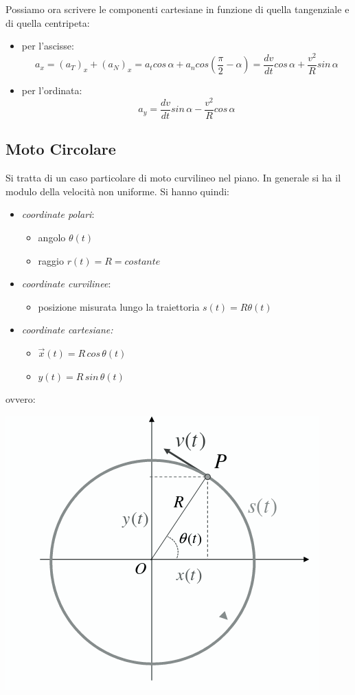 \documentclass[a4paper,12pt, oneside]{book}
\begin{document}
Possiamo ora scrivere le componenti cartesiane in funzione di quella tangenziale e di quella centripeta:
\begin{itemize}
\item per l'ascisse:
$$a_x=(a_T)_x+(a_N)_x=a_tcos\,\alpha+a_ncos\left(\frac{\pi}{2}-\alpha\right)=\frac{dv}{dt}cos\,\alpha+\frac{v^2}{R}sin\,\alpha$$
\item per l'ordinata:
$$a_y=\frac{dv}{dt}sin\,\alpha-\frac{v^2}{R}cos\,\alpha$$
\end{itemize}
\subsection{Moto Circolare}
Si tratta di un caso particolare di moto curvilineo nel piano. In generale si ha il modulo della velocità non uniforme. Si hanno quindi:
\begin{itemize}
\item \textit{coordinate polari}:
\begin{itemize}
\item angolo $\theta(t)$
\item raggio $r(t)=R=costante$
\end{itemize}
\item \textit{coordinate curvilinee}:
\begin{itemize}
\item posizione misurata lungo la traiettoria $s(t)=R\theta (t)$
\end{itemize}
\item \textit{coordinate cartesiane:}
\begin{itemize}
\item $\vec{x}(t)=R\,cos\,\theta(t)$
\item $y(t)=R\,sin\,\theta(t)$
\end{itemize}
\end{itemize}
ovvero:
\begin{center}
\includegraphics[scale=0.52]{img/cir.png}
\end{center}
\end{document}

